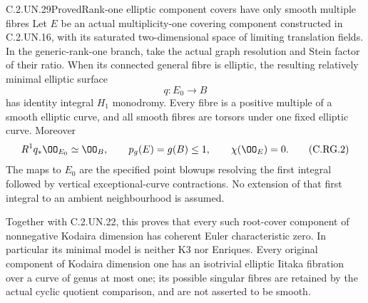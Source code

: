 \begin{statement}{C.2.UN.29}{Proved}{Rank-one elliptic component covers have only smooth multiple fibres}
Let $E$ be an actual multiplicity-one covering component
constructed in C.2.UN.16, with its saturated two-dimensional
space of limiting translation fields. In the generic-rank-one
branch, take the actual graph resolution and Stein factor
of their ratio. When its connected general fibre is elliptic,
the resulting relatively minimal elliptic surface
\[
                         q:E_0\longrightarrow B
                                                               \tag{C.RG.1}
\]
has identity integral $H_1$ monodromy. Every fibre is a
positive multiple of a smooth elliptic curve, and all smooth
fibres are torsors under one fixed elliptic curve. Moreover
\[
 R^1q_*\OO_{E_0}\simeq\OO_B,\qquad
 p_g(E)=g(B)\le1,\qquad \chi(\OO_E)=0.
                                                               \tag{C.RG.2}
\]
The maps to $E_0$ are the specified point blowups resolving
the first integral followed by vertical exceptional-curve
contractions. No extension of that first integral to an
ambient neighbourhood is assumed.

Together with C.2.UN.22, this proves that every such root-cover
component of nonnegative Kodaira dimension has coherent
Euler characteristic zero. In particular its minimal model
is neither K3 nor Enriques. Every original component of
Kodaira dimension one has an isotrivial elliptic Iitaka
fibration over a curve of genus at most one; its possible
singular fibres are retained by the actual cyclic quotient
comparison, and are not asserted to be smooth.
\end{statement}
